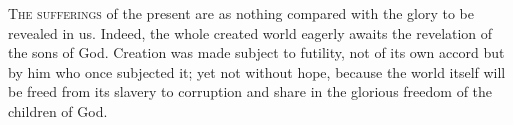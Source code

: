 
\lettrine{T}{he sufferings} of the present are as nothing compared with the glory to be revealed in us. Indeed, the whole created world eagerly awaits the revelation of the sons of God. Creation was made subject to futility, not of its own accord but by him who once subjected it; yet not without hope, because the world itself will be freed from its slavery to corruption and share in the glorious freedom of the children of God.
